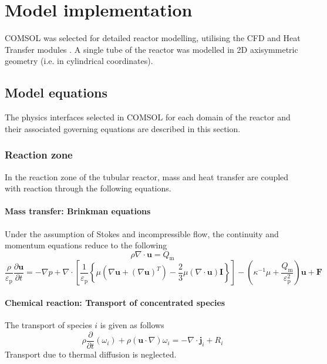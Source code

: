\section{Model implementation}

COMSOL was selected for detailed reactor modelling, utilising the CFD and Heat Transfer modules \cite{comsol_comsol_2020,comsol_cfd_2020,comsol_heat_2020}. A single tube of the reactor was modelled in 2D axisymmetric geometry (i.e. in cylindrical coordinates). 

\subsection{Model equations}
The physics interfaces selected in COMSOL for each domain of the reactor and their associated governing equations are described in this section.

\subsubsection{Reaction zone}

In the reaction zone of the tubular reactor, mass and heat transfer are coupled with reaction through the following equations.

\paragraph{Mass transfer: Brinkman equations}

Under the assumption of Stokes and incompressible flow, the continuity and momentum equations reduce to the following \cite{comsol_cfd_2020}
\begin{equation}
    \rho\nabla \cdot \mathbf{u}=Q_{\mathrm{m}}
\end{equation}
\begin{equation}
    \frac{\rho}{\varepsilon_{\mathrm{p}}} \frac{\partial \mathbf{u}}{\partial t} =
    -\nabla p+\nabla \cdot\left[\frac{1}{\varepsilon_{\mathrm{p}}}\left\{\mu\left(\nabla \mathbf{u}+(\nabla \mathbf{u})^{T}\right)-\frac{2}{3} \mu(\nabla \cdot \mathbf{u}) \mathbf{I}\right\}\right]-\left(\kappa^{-1} \mu+\frac{Q_{\mathrm{m}}}{\varepsilon_{\mathrm{p}}^{2}}\right) \mathbf{u}+\mathbf{F}
\end{equation}

\paragraph{Chemical reaction: Transport of concentrated species}
The transport of species $i$ is given as follows \cite{comsol_cfd_2020}
\begin{equation}
    \rho \frac{\partial}{\partial t}\left(\omega_{i}\right)+\rho(\mathbf{u} \cdot \nabla) \omega_{i}=-\nabla \cdot \mathbf{j}_{i}+R_{i}
\end{equation}
Transport due to thermal diffusion is neglected.

